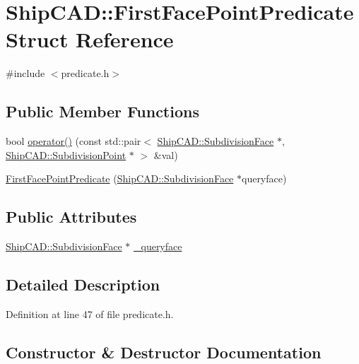 \hypertarget{structShipCAD_1_1FirstFacePointPredicate}{}\section{Ship\+C\+AD\+:\+:First\+Face\+Point\+Predicate Struct Reference}
\label{structShipCAD_1_1FirstFacePointPredicate}


{\ttfamily \#include $<$predicate.\+h$>$}

\subsection*{Public Member Functions}
\begin{DoxyCompactItemize}
\item 
bool \hyperlink{structShipCAD_1_1FirstFacePointPredicate_a73457d4c893ed3a5881178ffc1802a89}{operator()} (const std\+::pair$<$ \hyperlink{classShipCAD_1_1SubdivisionFace}{Ship\+C\+A\+D\+::\+Subdivision\+Face} $\ast$, \hyperlink{classShipCAD_1_1SubdivisionPoint}{Ship\+C\+A\+D\+::\+Subdivision\+Point} $\ast$ $>$ \&val)
\item 
\hyperlink{structShipCAD_1_1FirstFacePointPredicate_ad4c0128aa7bdd63f0674b6ee6d24819a}{First\+Face\+Point\+Predicate} (\hyperlink{classShipCAD_1_1SubdivisionFace}{Ship\+C\+A\+D\+::\+Subdivision\+Face} $\ast$queryface)
\end{DoxyCompactItemize}
\subsection*{Public Attributes}
\begin{DoxyCompactItemize}
\item 
\hyperlink{classShipCAD_1_1SubdivisionFace}{Ship\+C\+A\+D\+::\+Subdivision\+Face} $\ast$ \hyperlink{structShipCAD_1_1FirstFacePointPredicate_a29ecdce23916a74f8378a893e1b0cdac}{\+\_\+queryface}
\end{DoxyCompactItemize}


\subsection{Detailed Description}


Definition at line 47 of file predicate.\+h.



\subsection{Constructor \& Destructor Documentation}
